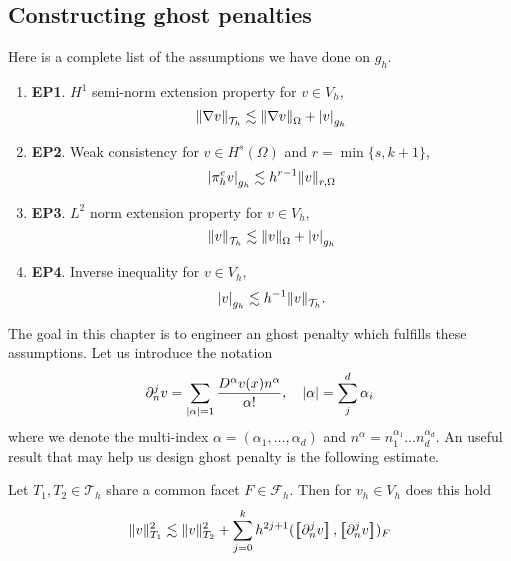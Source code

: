 \subsection{Constructing ghost penalties}%
\label{sub:constructing_ghost_penalties}

Here is a complete list of the assumptions we have done on $g_{h}$.

\begin{enumerate}[label=(\roman*)]
\item \textbf{EP1}.
    $H^{1}$ semi-norm extension property for $v \in  V_{h}$,
    \begin{equation}
        \label{eq:EP1}
    \| \nabla v \|_{ \mathcal{T} _{h} }^{  }  \lesssim \| \nabla v \|_{ \Omega  }^{  }  + \left\lvert  v  \right\rvert _{g_{h}}
    \end{equation}
\item \textbf{EP2}.
    Weak consistency for $v \in H^{s}( \Omega ) $ and $r = \min\{s, k+1\} $,
    \begin{equation}
        \label{eq:EP2}
    \left\lvert  \pi ^{e}_{h} v  \right\rvert_{g_{h}} \lesssim  h^{r-1} \| v \|_{ r,\Omega  }^{  }
    \end{equation}

\item \textbf{EP3}.
    $L^{2}$ norm extension property for $v \in V_{h}$,
    \begin{equation}
    \label{eq:EP3}
    \| v \|_{ \mathcal{T} _{h} }^{  } \lesssim \| v  \|_{\Omega   }^{  }   + \left\lvert  v  \right\rvert _{g_{h}}
    \end{equation}
    \item\textbf{EP4}.
    Inverse inequality for $v \in  V_{h}$,
    \begin{equation}
    \label{eq:EP4}
    \left\lvert  v  \right\rvert _{g_{h}} \lesssim h^{-1} \| v \|_{ \mathcal{T} _{h} }^{  } .
    \end{equation}

\end{enumerate}


The goal in this chapter is to engineer an ghost penalty which fulfills these assumptions.
Let us introduce the notation \[
\partial _{n}^{j} v = \sum_{\left\lvert  \alpha   \right\rvert =1 }^{} \frac{D^{\alpha }v( x) n^{\alpha }}{\alpha !}, \quad \left\lvert  \alpha   \right\rvert = \sum_{j}^{d} \alpha_{i}
\]
where we denote the multi-index $\alpha  = ( \alpha _{1}, \ldots, \alpha _{d})  $  and $n^{\alpha } = n_{1}^{\alpha _{1}} \ldots n_{d}^{\alpha _{d}}$. An useful result that may help us design ghost penalty is the following estimate.
\begin{lemma}
    \label{lemma:local_facet_estimate}
    Let $T_{1}, T_{2} \in  \mathcal{T} _{h} $ share a common facet $F \in \mathcal{F}_{h} $. Then for $v_{h} \in  V_{h}$  does this hold \[
    \| v \|_{ T_{1} }^{  2}  \lesssim  \| v \|_{ T_{2} }^{2  }  + \sum_{j=0}^{k}  h^{2j +1} ( \jump{ \partial _{n}^{j} v}, \jump{ \partial _{n}^{j} v}    )_{F}
    \]
\end{lemma}

